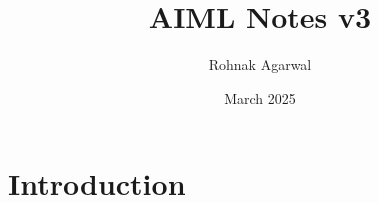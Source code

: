 \documentclass{article}
\title{AIML Notes v3}
\author{Rohnak Agarwal}
\date{March 2025}
\begin{document}
\maketitle

\section{Introduction}
\end{document}
